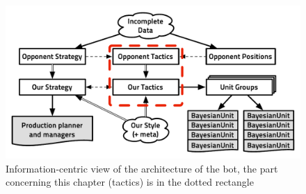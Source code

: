 \begin{figure}[!ht]
\begin{center}
\includegraphics[width=13cm]{images/starcraft_bbq_concept_TACTICS.pdf}
\end{center}
\label{fig:conceptTACTICS}
\caption{Information-centric view of the architecture of the bot, the part concerning this chapter (tactics) is in the dotted rectangle}
\end{figure}

